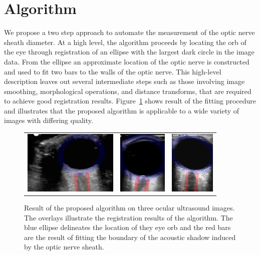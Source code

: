 \documentclass{llncs}
\begin{document}
\section{Algorithm}
We propose a two step approach to automate the measurement of the optic nerve
sheath diameter. At a high level, the algorithm proceeds by locating the orb of
the eye through registration of an ellipse with the largest dark circle in the
image data. From the ellipse an approximate location of the optic nerve is
constructed and used to fit two bars to the walls of the optic nerve. This
high-level description leaves out several intermediate steps such as those
involving image smoothing, morphological operations, and distance transforms,
that are required to achieve good registration results. Figure~\ref{fig:fitted}
shows result of the fitting procedure and illustrates that the proposed
algorithm is applicable to a wide variety of images with differing quality.
\begin{figure}
\centering
\begin{tabular}{ccc}
\includegraphics[height=1.2in]{003-overlay.png} &
\includegraphics[height=1.2in]{009-overlay.png} &
\includegraphics[height=1.2in]{023-overlay.png} 
\end{tabular}
\caption{
\label{fig:fitted}
Result of the proposed algorithm on three ocular ultrasound images. The
overlays illustrate the registration results of the algorithm. The blue ellipse
delineates the location of they eye orb and the red bars are the result of
fitting the boundary of the acoustic shadow induced by the optic nerve sheath.
}
\end{figure}
\end{document}
